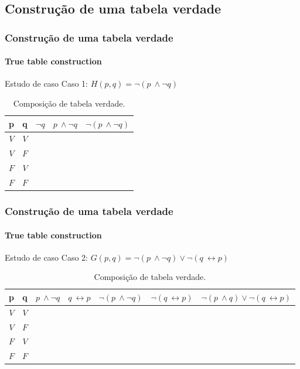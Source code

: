 \documentclass[10pt, headsepline, captions=tableabove, xcolor=table]{beamer}
\begin{document}
\subsection{Construção de uma tabela verdade}
%
\begin{frame}[t]
    \frametitle{Construção de uma tabela verdade}
    \framesubtitle{True table construction}
    \begin{exampleblock}{Estudo de caso}
        Caso 1: $H(p,q) = \lnot (p~\land \lnot q)$
    \end{exampleblock}
    \begin{table}[T]
        \caption{Composição de tabela verdade.}
        \label{tab:tabela-caso-1}
        \begin{tabular}{|c|c|c|l|l|}
        \hline
        \rowcolor[HTML]{EFEFEF} 
        \textbf{p} & \textbf{q} & \textbf{$\lnot q$} & \textbf{$p~\land \lnot q$} & \textbf{$\lnot (p~\land \lnot q)$} \\ \hline
        $V$ & $V$ &  &  &  \\ \hline
        $V$ & $F$ &  &  &  \\ \hline
        $F$ & $V$ &  &  &  \\ \hline
        $F$ & $F$ &  &  &  \\ \hline
        \end{tabular}
    \end{table}
\end{frame}
%
\begin{frame}[t]
    \frametitle{Construção de uma tabela verdade}
    \framesubtitle{True table construction}
    \begin{exampleblock}{Estudo de caso}
        Caso 2: $G(p,q) = \lnot (p~\land \lnot q) \lor \lnot (q~\leftrightarrow p)$
    \end{exampleblock}
    \small
    \begin{table}[ht]
        \caption{Composição de tabela verdade.}
        \label{tab:tabela-caso-2}
        \begin{tabular}{|c|c|c|l|l|l|l|}
        \hline
        \rowcolor[HTML]{EFEFEF} 
        \textbf{p} &
        \textbf{q} &
        \textbf{$p~\land \lnot q$} &
        \textbf{$q~\leftrightarrow p$} &
        \textbf{$\lnot (p~\land \lnot q)$} &
        \textbf{$\lnot (q~\leftrightarrow p)$} &
        \textbf{$\lnot (p~\land q) \lor \lnot (q~\leftrightarrow p)$} \\ \hline
        $V$ & $V$ &  &  &  &  &  \\ \hline
        $V$ & $F$ &  &  &  &  &  \\ \hline
        $F$ & $V$ &  &  &  &  &  \\ \hline
        $F$ & $F$ &  &  &  &  &  \\ \hline
        \end{tabular}
    \end{table}
\end{frame}
%
\end{document}
